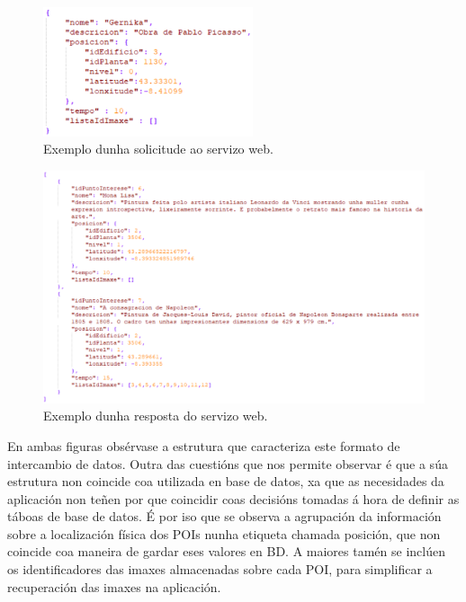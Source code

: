 \begin{figure}[tbh]
	\begin{center}
		\includegraphics[width=0.55\textwidth]{figures/codigo/jsonRequest}
		\caption{Exemplo dunha solicitude ao servizo web.}
		\label{fig:jsonRequest}
	\end{center}
\end{figure}

\begin{figure}[tbh]
	\begin{center}
		\includegraphics[width=1\textwidth]{figures/codigo/json}
		\caption{Exemplo dunha resposta do servizo web.}
		\label{fig:json}
	\end{center}
\end{figure}

En ambas figuras obsérvase a estrutura que caracteriza este formato de intercambio de datos. Outra das cuestións que nos permite observar é que a súa estrutura non coincide coa utilizada en base de datos, xa que as necesidades da aplicación non teñen por que coincidir coas decisións tomadas á hora de definir as táboas de base de datos. É por iso que se observa a agrupación da información sobre a localización física dos POIs nunha etiqueta chamada posición, que non coincide coa maneira de gardar eses valores en BD. A maiores tamén se inclúen os identificadores das imaxes almacenadas sobre cada POI, para simplificar a recuperación das imaxes na aplicación.

